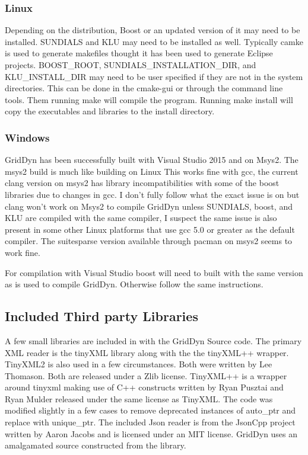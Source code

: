 \documentclass[12pt]{article} %
\begin{document}
\subsubsection{Linux}
Depending on the distribution, Boost or an updated version of it may need to be installed.  SUNDIALS and KLU may need to be installed as well.  Typically camke is used to generate makefiles thought it has been used to generate Eclipse projects.    BOOST\_ROOT, SUNDIALS\_INSTALLATION\_DIR, and KLU\_INSTALL\_DIR may need to be user specified if they are not in the system directories.  This can be done in the cmake-gui or through the command line tools.  Them running make will compile the program.   
Running make install will copy the executables and libraries to the install directory.  

\subsubsection{Windows}
GridDyn has been successfully built with Visual Studio 2015 and on Msys2.  The msys2 build is much like building on Linux  This works fine with gcc,  the current clang version on msys2 has library incompatibilities with some of the boost libraries due to changes in gcc.  I don't fully follow what the exact issue is on but clang won't work on Msys2 to compile GridDyn unless SUNDIALS, boost, and KLU are compiled with the same compiler, I suspect the same issue is also present in some other Linux platforms that use gcc 5.0 or greater as the default compiler.  The suitesparse version available through pacman on msys2 seems to work fine.  

For compilation with Visual Studio boost will need to built with the same version as is used to compile GridDyn.  Otherwise follow the same instructions.  

\subsection{Included Third party Libraries}
A few small libraries are included in with the GridDyn Source code.  The primary XML reader is the tinyXML library along with the the tinyXML++ wrapper.  TinyXML2 is also used in a few circumstances.  Both were written by Lee Thomason.  Both are released under a Zlib license.  TinyXML++ is a wrapper around tinyxml making use of C++ constructs written by Ryan Pusztai and Ryan Mulder released under the same license as TinyXML.  The code was modified slightly in a few cases to remove deprecated instances of auto\_ptr and replace with unique\_ptr.  The included Json reader is from the JsonCpp project written by Aaron Jacobs and is licensed under an MIT license.  GridDyn uses an amalgamated source constructed from the library.  
\end{document}
